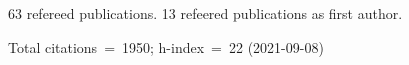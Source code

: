 63 refereed publications. 13 refeered publications as first author.

Total citations~=~1950; h-index~=~22 (2021-09-08)